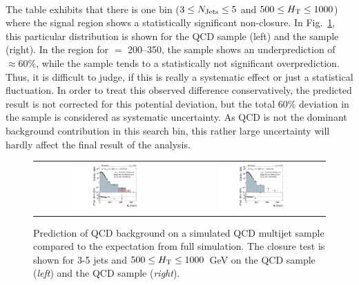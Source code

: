 \\
The table exhibits that there is one bin ($3 \leq N_{\text{Jets}} \leq 5$ and $500 \leq H_{\text{T}} \leq 1000$\gev) where the signal region shows a statistically significant non-closure. In Fig.~\ref{fig:qcd_rs_closure_comp}, this particular distribution is shown for the \madgraph QCD sample (left) and the \pythia sample (right). In the region for \MHT $=$ 200--350\gev, the \madgraph sample shows an underprediction of $\approx 60\%$, while the \pythia sample tends to a statistically not significant overprediction. Thus, it is difficult to judge, if this is really a systematic effect or just a statistical fluctuation. In order to treat this observed difference conservatively, the predicted result is not corrected for this potential deviation, but the total 60\% deviation in the \madgraph sample is considered as systematic uncertainty. As QCD is not the dominant background contribution in this search bin, this rather large uncertainty will hardly affect the final result of the analysis.
\begin{figure}[!t]
  \centering
  \begin{tabular}{cc}
                \includegraphics[width=0.49\textwidth]{figures/MHT_JetBin2_HTlow_madgraph_DR53X_chs_TuneZ2star_pt10_withoutPUReweighting_UseRebCorrection_v1.pdf} &
                \includegraphics[width=0.49\textwidth]{figures/MHT_JetBin2_HTlow_pythia_DR53X_chs_TuneZ2star_pt10_withoutPUReweighting_UseRebCorrection_v1.pdf}\\
  \end{tabular}
  \caption{Prediction of QCD background on a simulated QCD multijet sample compared to the expectation from full simulation. The closure test is shown for 3-5 jets and $ 500 \leq H_{\text{T}} \leq 1000$~GeV on the \madgraph QCD sample (\textit{left}) and the \pythia QCD sample (\textit{right}).}
  \label{fig:qcd_rs_closure_comp}
\end{figure}
